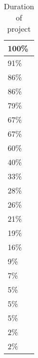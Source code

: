 \documentclass{sig-alternate-05-2015}
\begin{document}
\begin{table}[]
\renewcommand{\arraystretch}{1.3}
\centering
\caption{Duration of project}
\label{my-label}
\begin{tabular}{|l|}
\hline
100\% \\ \hline
91\%  \\ \hline
86\%  \\ \hline
86\%  \\ \hline
79\%  \\ \hline
67\%  \\ \hline
67\%  \\ \hline
60\%  \\ \hline
40\%  \\ \hline
33\%  \\ \hline
28\%  \\ \hline
26\%  \\ \hline
21\%  \\ \hline
19\%  \\ \hline
16\%  \\ \hline
9\%   \\ \hline
7\%   \\ \hline
5\%   \\ \hline
5\%   \\ \hline
5\%   \\ \hline
2\%   \\ \hline
2\%   \\ \hline
\end{tabular}
\end{table}
\end{document}
